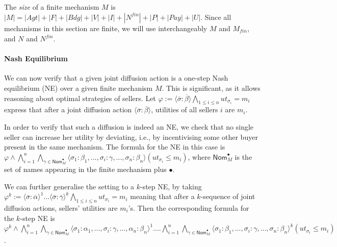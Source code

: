 \documentclass[letterpaper]{article} %
\theoremstyle{definition}
\newcommand{\Pay}{\mathit{Pay}}
\newcommand{\Nfin}{N^{\mathit{fin}}}
\newcommand{\Mfin}{M_{\mathit{fin}}}
\begin{document}
The \emph{size} of a finite mechanism $M$ %
is $|M| = |Agt| + |F| + |Bdg| + |V| + |I| + |\Nfin| + |P| + |\Pay| + |U|$.
Since all mechanisms in this section are finite, we will %
use interchangeably $M$ and $\Mfin$, and $N$ and $\Nfin$.

\paragraph{Nash Equilibrium} %
We can now verify that a given joint diffusion action is a one-step Nash equilibrium (NE) over a given finite mechanism $M$. This is significant, as it allows reasoning about optimal strategies of sellers. %
Let $\varphi := \langle \overline{\sigma}: \overline{\beta}\rangle \bigwedge_{1\leqslant i \leqslant n} ut_{\sigma_i} = m_i$ express that after a joint diffusion action $\langle \overline{\sigma}: \overline{\beta}\rangle$, utilities of all sellers $i$ are $m_i$. 

In order to verify that such a diffusion is indeed an NE, we check that no single seller can increase her utility by deviating, i.e., by incentivising some other buyer present in the same mechanism. 
The formula for the NE in this case is %
$\varphi \land \bigwedge_{i = 1}^n \bigwedge_{\gamma \in \mathsf{Nom}^{\bullet}_M} \langle\sigma_1: \beta_1, ..., \sigma_i:\gamma, ..., \sigma_n: \beta_n \rangle (ut_{\sigma_i} \leqslant m_i)$,
where $\mathsf{Nom}^{\bullet}_M$ is the set of names appearing in the finite mechanism plus $\bullet$. %

We can further generalise the setting to a $k$-step NE, by taking $\varphi^k := \langle \overline{\sigma}: \overline{\alpha}\rangle^1 ... \langle \overline{\sigma}: \overline{\gamma}\rangle^k \bigwedge_{1\leqslant i \leqslant n} ut_{\sigma_i} = m_i$ meaning that after a $k$-sequence of joint diffusion actions, sellers' utilities are $m_i$'s. Then the corresponding formula for the $k$-step NE is $\varphi^k \land \bigwedge_{i = 1}^n \bigwedge_{\gamma \in \mathsf{Nom}^{\bullet}_M} \langle\sigma_1: \alpha_1, ..., \sigma_i:\gamma, ..., \alpha_n: \beta_n \rangle^1 .... \bigwedge_{i = 1}^n \bigwedge_{\gamma \in \mathsf{Nom}^{\bullet}_M} \langle\sigma_1: \beta_1, ..., \sigma_i:\gamma, ..., \sigma_n: \beta_n \rangle^k (ut_{\sigma_i} \leqslant m_i)$.
\end{document}
